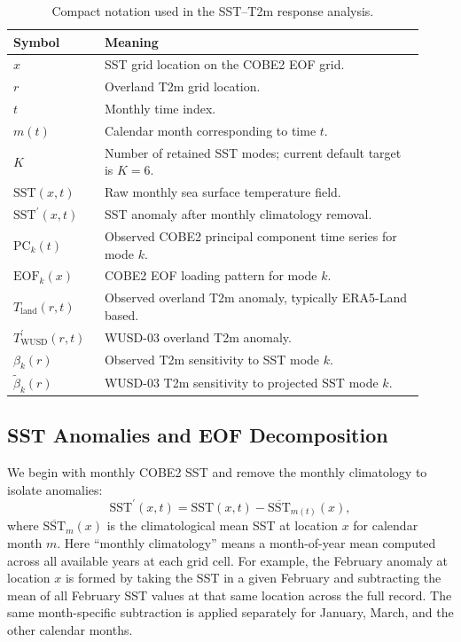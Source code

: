 \documentclass[11pt]{article}
\newcommand{\sst}{\mathrm{SST}}
\newcommand{\tobs}{T_{\mathrm{land}}}
\newcommand{\twusd}{T^{\prime}_{\mathrm{WUSD}}}
\newcommand{\pc}[1]{\mathrm{PC}_{#1}}
\newcommand{\eof}[1]{\mathrm{EOF}_{#1}}
\begin{document}
\begin{table}[h]
\centering
\begin{tabular}{>{\raggedright\arraybackslash}p{0.20\linewidth} >{\raggedright\arraybackslash}p{0.72\linewidth}}
\toprule
Symbol & Meaning \\
\midrule
$x$ & SST grid location on the COBE2 EOF grid. \\
$r$ & Overland T2m grid location. \\
$t$ & Monthly time index. \\
$m(t)$ & Calendar month corresponding to time $t$. \\
$K$ & Number of retained SST modes; current default target is $K=6$. \\
$\sst(x,t)$ & Raw monthly sea surface temperature field. \\
$\sst^{\prime}(x,t)$ & SST anomaly after monthly climatology removal. \\
$\pc{k}(t)$ & Observed COBE2 principal component time series for mode $k$. \\
$\eof{k}(x)$ & COBE2 EOF loading pattern for mode $k$. \\
$\tobs(r,t)$ & Observed overland T2m anomaly, typically ERA5-Land based. \\
$\twusd(r,t)$ & WUSD-03 overland T2m anomaly. \\
$\beta_k(r)$ & Observed T2m sensitivity to SST mode $k$. \\
$\widetilde{\beta}_k(r)$ & WUSD-03 T2m sensitivity to projected SST mode $k$. \\
\bottomrule
\end{tabular}
\caption{Compact notation used in the SST--T2m response analysis.}
\label{tab:notation}
\end{table}

\subsection{SST Anomalies and EOF Decomposition}
\label{subsec:sst_eof}

We begin with monthly COBE2 SST and remove the monthly climatology to isolate anomalies:
\begin{equation}
\sst^{\prime}(x,t) = \sst(x,t) - \overline{\sst}_{m(t)}(x),
\label{eq:sst_anomaly}
\end{equation}
where $\overline{\sst}_{m}(x)$ is the climatological mean SST at location $x$ for calendar month $m$.
Here ``monthly climatology'' means a month-of-year mean computed across all available years at each
grid cell. For example, the February anomaly at location $x$ is formed by taking the SST in a given
February and subtracting the mean of all February SST values at that same location across the full
record. The same month-specific subtraction is applied separately for January, March, and the other
calendar months.
\end{document}
